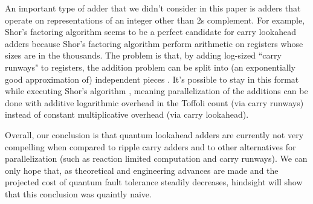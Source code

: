 \documentclass[onecolumn,unpublished]{quantumarticle}
\theoremstyle{definition}
\theoremstyle{definition}
\theoremstyle{definition}
\begin{document}
An important type of adder that we didn't consider in this paper is adders that operate on representations of an integer other than 2s complement.
For example, Shor's factoring algorithm \cite{shor1994algorithms} seems to be a perfect candidate for carry lookahead adders because Shor's factoring algorithm perform arithmetic on registers whose sizes are in the thousands.
The problem is that, by adding log-sized ``carry runways" to registers, the addition problem can be split into (an exponentially good approximation of) independent pieces \cite{gidney2019approximate}.
It's possible to stay in this format while executing Shor's algorithm \cite{gidney2019factor}, meaning parallelization of the additions can be done with additive logarithmic overhead in the Toffoli count (via carry runways) instead of constant multiplicative overhead (via carry lookahead).

Overall, our conclusion is that quantum lookahead adders are currently not very compelling when compared to ripple carry adders and to other alternatives for parallelization (such as reaction limited computation and carry runways).
We can only hope that, as theoretical and engineering advances are made and the projected cost of quantum fault tolerance steadily decreases, hindsight will show that this conclusion was quaintly naive.





\end{document}
